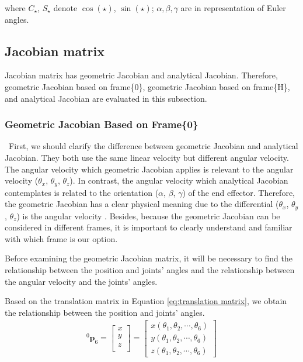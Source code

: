where $C_{\star} $, $ S_{\star}$ denote $\cos \left(\star \right)$, $\sin \left(\star \right)$; $\alpha ,\beta ,\gamma$ are in representation of Euler angles.
\subsection*	{Jacobian matrix} 
\label{sec:jacobian}
\hspace*{6mm}Jacobian matrix has geometric Jacobian and analytical Jacobian. Therefore, geometric Jacobian based on frame\{0\}, geometric Jacobian based on frame\{H\}, and analytical Jacobian are evaluated in this subsection.
\subsubsection{Geometric Jacobian Based on Frame\{0\}}
\hspace*{6mm}\
First, we should clarify the difference between geometric Jacobian and analytical Jacobian. They both use the same linear velocity but different angular velocity. The angular velocity which geometric Jacobian applies is relevant to the angular velocity ($\theta _x$, $\theta _y$, $\theta _z$). In contrast, the angular velocity which analytical Jacobian contemplates is related to the orientation ($\alpha$, $\beta$, $\gamma$) of the end effector. Therefore, the geometric Jacobian has a clear physical meaning due to the differential ($\theta _x$, $\theta _y$, $\theta _z$) is the angular velocity . Besides, because the geometric Jacobian can be considered in different frames, it is important to clearly understand and familiar with which frame is our option.
\par
Before examining the geometric Jacobian matrix, it will be necessary to find the relationship between the position and joints' angles and the relationship between the angular velocity and the joints' angles.
\par
Based on the translation matrix in Equation \ref{eq:translation matrix}, we obtain the relationship between the position and joints' angles.
\begin{equation}
\label{eq:lin vel}
\begin{split}
^0\boldsymbol{p}_\mathrm{6}
= 
\begin{bmatrix}
x\\
y\\
z\\
\end{bmatrix} 
=
\begin{bmatrix}
x(\theta _1, \theta _2, \cdots, \theta _6)\\
y(\theta _1, \theta _2, \cdots, \theta _6)\\
z(\theta _1, \theta _2, \cdots, \theta _6)
\end{bmatrix} 
\end{split}
\end{equation}
